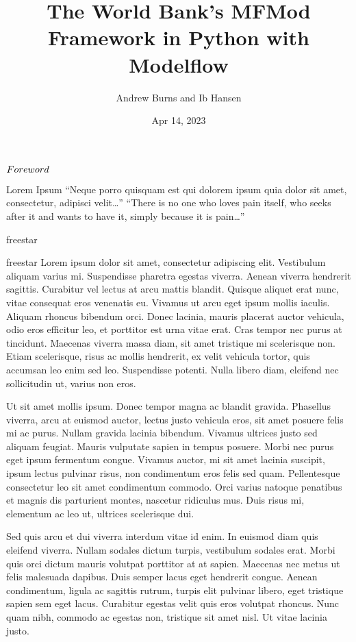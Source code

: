 \documentclass[letterpaper,10pt,english]{jupyterBook}
\title{The World Bank's MFMod Framework in Python with Modelflow}
\date{Apr 14, 2023}
\author{Andrew Burns and Ib Hansen}
\begin{document}
\pagestyle{empty}
\sphinxmaketitle
\pagestyle{plain}
\sphinxtableofcontents
\pagestyle{normal}
\label{\detokenize{content/introduction::doc}}


\sphinxAtStartPar
\(\Large{Foreword}\)

\sphinxAtStartPar
Lorem Ipsum
“Neque porro quisquam est qui dolorem ipsum quia dolor sit amet, consectetur, adipisci velit…”
“There is no one who loves pain itself, who seeks after it and wants to have it, simply because it is pain…”

\sphinxAtStartPar
freestar

\sphinxAtStartPar
freestar
Lorem ipsum dolor sit amet, consectetur adipiscing elit. Vestibulum aliquam varius mi. Suspendisse pharetra egestas viverra. Aenean viverra hendrerit sagittis. Curabitur vel lectus at arcu mattis blandit. Quisque aliquet erat nunc, vitae consequat eros venenatis eu. Vivamus ut arcu eget ipsum mollis iaculis. Aliquam rhoncus bibendum orci. Donec lacinia, mauris placerat auctor vehicula, odio eros efficitur leo, et porttitor est urna vitae erat. Cras tempor nec purus at tincidunt. Maecenas viverra massa diam, sit amet tristique mi scelerisque non. Etiam scelerisque, risus ac mollis hendrerit, ex velit vehicula tortor, quis accumsan leo enim sed leo. Suspendisse potenti. Nulla libero diam, eleifend nec sollicitudin ut, varius non eros.

\sphinxAtStartPar
Ut sit amet mollis ipsum. Donec tempor magna ac blandit gravida. Phasellus viverra, arcu at euismod auctor, lectus justo vehicula eros, sit amet posuere felis mi ac purus. Nullam gravida lacinia bibendum. Vivamus ultrices justo sed aliquam feugiat. Mauris vulputate sapien in tempus posuere. Morbi nec purus eget ipsum fermentum congue. Vivamus auctor, mi sit amet lacinia suscipit, ipsum lectus pulvinar risus, non condimentum eros felis sed quam. Pellentesque consectetur leo sit amet condimentum commodo. Orci varius natoque penatibus et magnis dis parturient montes, nascetur ridiculus mus. Duis risus mi, elementum ac leo ut, ultrices scelerisque dui.

\sphinxAtStartPar
Sed quis arcu et dui viverra interdum vitae id enim. In euismod diam quis eleifend viverra. Nullam sodales dictum turpis, vestibulum sodales erat. Morbi quis orci dictum mauris volutpat porttitor at at sapien. Maecenas nec metus ut felis malesuada dapibus. Duis semper lacus eget hendrerit congue. Aenean condimentum, ligula ac sagittis rutrum, turpis elit pulvinar libero, eget tristique sapien sem eget lacus. Curabitur egestas velit quis eros volutpat rhoncus. Nunc quam nibh, commodo ac egestas non, tristique sit amet nisl. Ut vitae lacinia justo.
\end{document}
